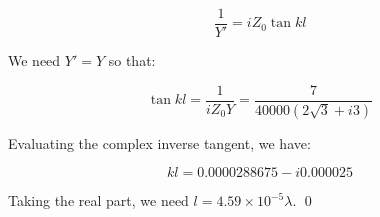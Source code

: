 \documentclass[12pt]{article}
\begin{document}
\begin{equation}
    \frac{1}{Y'} = iZ_{0} \tan{kl}
\end{equation}

We need $Y' = Y$ so that:

\begin{equation}
    \tan{kl} = \frac{1}{iZ_{0}Y} = \frac{7}{40000(2\sqrt{3} + i3)}
\end{equation}

Evaluating the complex inverse tangent, we have:

\begin{equation}
    kl = 0.0000288675 - i0.000025
\end{equation}

Taking the real part, we need $l = 4.59 \times 10^{-5} \lambda$.
\qed
\end{document}

